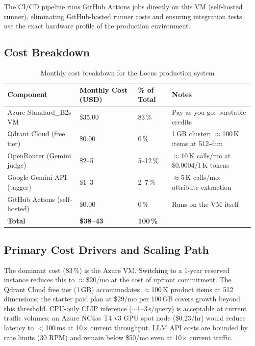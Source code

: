 \documentclass[12pt]{article}
\begin{document}
The CI/CD pipeline runs GitHub Actions jobs directly on this VM (self-hosted runner), eliminating GitHub-hosted runner costs and ensuring integration tests use the exact hardware profile of the production environment.

\subsection{Cost Breakdown}

\begin{table}[H]
\centering
\small
\begin{tabular}{@{}llll@{}}
\toprule
\textbf{Component} & \textbf{Monthly Cost (USD)} & \textbf{\% of Total} & \textbf{Notes} \\ \midrule
Azure Standard\_B2s VM   & \$35.00  & 83\,\% & Pay-as-you-go; burstable credits \\
Qdrant Cloud (free tier) & \$0.00   & 0\,\%  & 1\,GB cluster; $\approx$100\,K items at 512-dim \\
OpenRouter (Gemini judge)& \$2--5   & 5--12\,\% & $\approx$10\,K calls/mo at \$0.0004/1\,K tokens \\
Google Gemini API (tagger)& \$1--3  & 2--7\,\% & $\approx$5\,K calls/mo; attribute extraction \\
GitHub Actions (self-hosted) & \$0.00 & 0\,\% & Runs on the VM itself \\ \midrule
\textbf{Total}           & \textbf{\$38--43} & \textbf{100\,\%} & \\ \bottomrule
\end{tabular}
\caption{Monthly cost breakdown for the Locus production system}
\label{tab:cost}
\end{table}

\subsection{Primary Cost Drivers and Scaling Path}

The dominant cost (83\,\%) is the Azure VM. Switching to a 1-year reserved instance reduces this to $\approx$\$20/mo at the cost of upfront commitment. The Qdrant Cloud free tier (1\,GB) accommodates $\approx$100\,K product items at 512 dimensions; the starter paid plan at \$29/mo per 100\,GB covers growth beyond this threshold. CPU-only CLIP inference ($\sim$1--3\,s/query) is acceptable at current traffic volumes; an Azure NC4as T4 v3 GPU spot node (\$0.23/hr) would reduce latency to $<$100\,ms at 10$\times$ current throughput. LLM API costs are bounded by rate limits (30 RPM) and remain below \$50/mo even at 10$\times$ current traffic.
\end{document}
